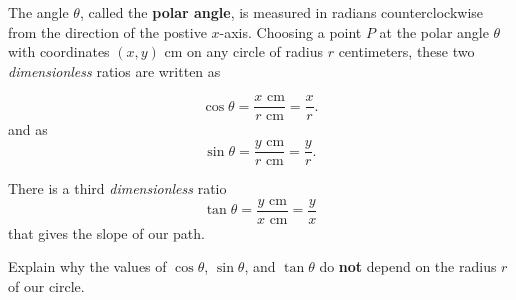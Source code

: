\documentclass{ximera}
\begin{document}
\begin{question}
The angle $\theta$, called the {\bf polar angle}, is measured in radians counterclockwise from the direction of the postive $x$-axis. Choosing a point $P$ at the polar angle $\theta$ with coordinates $(x,y)$ cm on any circle of radius $r$ centimeters, these two \emph{dimensionless} ratios are written as

\[
   \cos \theta = \frac{x \text{ cm}}{r \text{ cm}} = \frac{x}{r} .
\]
and as
\[
   \sin \theta = \frac{y \text{ cm}}{r \text{ cm}} = \frac{y}{r} .
\]

There is a third \emph{dimensionless} ratio 
\[
  \tan \theta = \frac{y \text{ cm}}{x \text{ cm}} = \frac{y}{x}
\]
that gives the slope of our path. 


\end{question}



\begin{question} \label{Q1:Cosine}
Explain why the values of $\cos \theta$, $\sin\theta$, and $\tan\theta$ do {\bf not} depend on the radius $r$ of our circle. 
\end{question}
\end{document}
